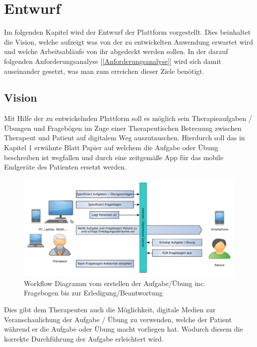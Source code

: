 
\chapter{Entwurf}\label{Entwurf}
Im folgenden Kapitel wird der Entwurf der Plattform vorgestellt. Dies beinhaltet die Vision, welche aufzeigt was von der zu entwickelten Anwendung erwartet wird und welche Arbeitsabläufe von ihr abgedeckt werden sollen.
In der darauf folgenden Anforderungsanalyse [\ref{Anforderungsanalyse}] wird sich damit auseinander gesetzt, was man zum erreichen dieser Ziele benötigt. 





\section{Vision}\label{Vision}
Mit Hilfe der zu entwickelnden Plattform soll es möglich sein Therapieaufgaben / Übungen und Fragebögen im Zuge einer Therapeutischen Betreuung zwischen Therapeut und Patient auf digitalem Weg auszutauschen. Hierdurch soll das in Kapitel 1 erwähnte Blatt Papier auf welchem die Aufgabe oder Übung beschreiben ist wegfallen und durch eine zeitgemäße App für das mobile Endgeräte des Patienten ersetzt werden.

\begin{figure}[H]
	\centering
	\includegraphics[scale=0.6]{images/AblaufAbstrakt}
	\caption[Workflow Diagramm vom erstellen der Aufgabe/Übung inc. Fragebogen bis zur Erledigung/Beantwortung]{Workflow Diagramm vom erstellen der Aufgabe/Übung inc. Fragebogen bis zur Erledigung/Beantwortung}
	\label{AblaufAbstrakt}
\end{figure}

Dies gibt dem Therapeuten auch die Möglichkeit, digitale Medien zur Veranschaulichung der Aufgabe / Übung zu verwenden, welche der Patient während er die Aufgabe oder Übung macht vorliegen hat. Wodurch diesem die korrekte Durchführung der Aufgabe erleichtert wird.


